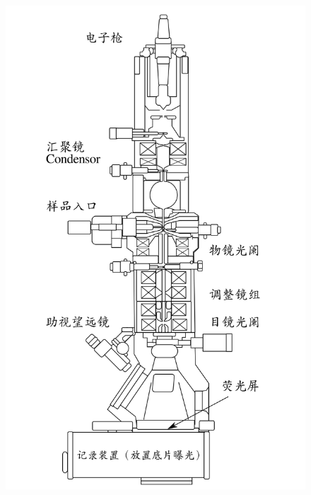 \documentclass[aps,pre,12pt,preprint,%
	onecolumn,showpacs,showkeys,nofootinbib]{revtex4-2}
\begin{document}
	\begin{figure}[!ht]
	\centering
	\newcommand{\TEMfigHeight}{22\baselineskip}
	\includegraphics[height=\TEMfigHeight]{Scheme_TEM}\ 

\end{figure}
\end{document}
